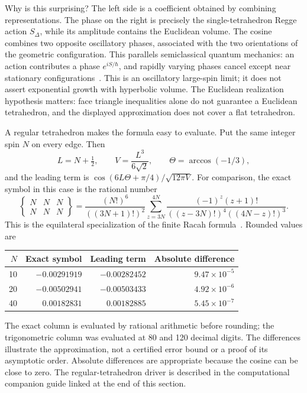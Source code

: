 Why is this surprising? The left side is a coefficient obtained by
combining representations. The phase on the right is precisely the
single-tetrahedron Regge action $S_\Delta$, while its amplitude
contains the Euclidean volume. The cosine combines two opposite
oscillatory phases, associated with the two orientations of the
geometric configuration. This parallels semiclassical quantum
mechanics: an action contributes a phase $e^{iS/\hbar}$, and rapidly
varying phases cancel except near stationary configurations~\cite{AquilantiSixJ}.
This is an oscillatory large-spin limit;
it does not assert exponential growth with hyperbolic volume.
The Euclidean realization hypothesis matters: face triangle
inequalities alone do not guarantee a Euclidean tetrahedron, and
the displayed approximation does not cover a flat tetrahedron.

A regular tetrahedron makes the formula easy to evaluate. Put the
same integer spin $N$ on every edge. Then
\[
 L=N+\tfrac12,\qquad V=\frac{L^3}{6\sqrt2},\qquad
 \Theta=\arccos(-1/3),
\]
and the leading term is $\cos(6L\Theta+\pi/4)/\sqrt{12\pi V}$.
For comparison, the exact symbol in this case is the rational number
\[
 \left\{\begin{matrix}N&N&N\\N&N&N\end{matrix}\right\}
 =\frac{(N!)^6}{((3N+1)!)^2}
   \sum_{z=3N}^{4N}
   \frac{(-1)^z(z+1)!}{((z-3N)!)^4((4N-z)!)^3}.
\]
This is the equilateral specialization of the finite Racah
formula~\cite[Eq.\ 34.4.2]{DLMFSixJ}. Rounded values are
\begin{center}
\begin{tabular}{@{}rrrr@{}}
\toprule
$N$ & Exact symbol & Leading term & Absolute difference\\
\midrule
10 & $-0.00291919$ & $-0.00282452$ & $9.47\times10^{-5}$\\
20 & $-0.00502941$ & $-0.00503433$ & $4.92\times10^{-6}$\\
40 & $\phantom{-}0.00182831$ & $\phantom{-}0.00182885$ & $5.45\times10^{-7}$\\
\bottomrule
\end{tabular}
\end{center}
The exact column is evaluated by rational arithmetic before rounding;
the trigonometric column was evaluated at 80 and 120 decimal digits.
The differences illustrate the approximation, not a certified error
bound or a proof of its asymptotic order. Absolute differences are
appropriate because the cosine can be close to zero.
The regular-tetrahedron driver is described in the computational
companion guide linked at the end of this section.

